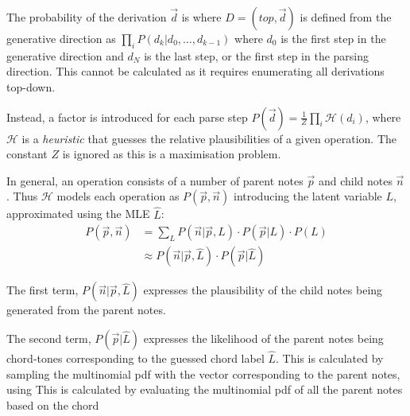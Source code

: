\documentclass[12pt,a4paper,twoside,openany]{report} \usepackage[pdfborder={0 0 0}]{hyperref}    %
\theoremstyle{definition} \newtheorem{definition}{Definition}[section]
\begin{document}
  The probability of the derivation $\vec{d}$ is where $D=(top, \vec{d})$ is defined from the generative direction as 
  $\prod_i P(d_k | d_0, \dots, d_{k-1})$ 
  where $d_0$ is the first step in the generative direction and $d_N$ is the last step, or the first step in the parsing direction. 
  This cannot be calculated as it requires enumerating all derivations top-down. 

  Instead, a factor is introduced for each parse step $P(\vec{d}) = \frac{1}{Z} \prod\limits_{i} \mathcal{H} (d_i)$, where
  $\mathcal{H}$ is a \textit{heuristic} that guesses the relative plausibilities of a given operation. The constant $Z$
  is ignored as this is a maximisation problem.

  In general, an operation consists of a number of parent notes $\vec{p}$ and child notes $\vec{n}$. 
  Thus $\mathcal{H}$ models each operation as $P(\vec{p}, \vec{n})$ introducing the latent variable $L$, approximated
  using the MLE $\hat{L}$:
  \begin{equation}
    \begin{aligned}
      P(\vec{p},\vec{n}) &= \sum\limits_L P(\vec{n}| \vec{p}, L)\cdot P(\vec{p} | L) \cdot P(L)\\
                         &\approx P(\vec{n}| \vec{p}, \hat{L})\cdot P(\vec{p} | \hat{L}) 
    \end{aligned}
    \label{eq:}
  \end{equation}

  The first term, $P(\vec{n}| \vec{p} , \hat{L})$ expresses the plausibility of the child notes being generated from
  the parent notes. 

  The second term, $P(\vec{p} | \hat{L})$ expresses the likelihood of the parent notes being chord-tones corresponding
  to the guessed chord label $\hat{L}$. This is calculated by sampling the multinomial pdf with the vector
  corresponding to the parent notes, using 
  This is calculated by evaluating the multinomial pdf of all the parent notes based on the chord
\end{document}
